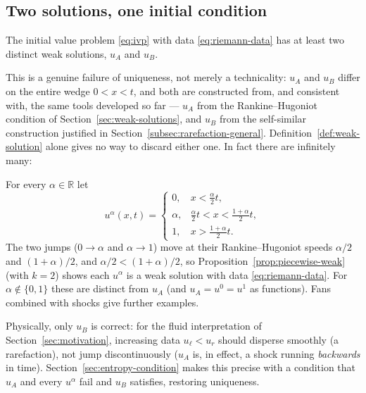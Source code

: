 \subsection{Two solutions, one initial condition}
\label{subsec:nonuniq-conclusion}

\begin{corollary}
\label{cor:nonuniqueness}
The initial value problem \eqref{eq:ivp} with data \eqref{eq:riemann-data}
has at least two distinct weak solutions, $u_A$ and $u_B$.
\end{corollary}

This is a genuine failure of uniqueness, not merely a technicality: $u_A$
and $u_B$ differ on the entire wedge $0<x<t$, and both are constructed
from, and consistent with, the same tools developed so far ---
$u_A$ from the Rankine--Hugoniot condition of
Section~\ref{sec:weak-solutions}, and $u_B$ from the self-similar
construction justified in Section~\ref{subsec:rarefaction-general}.
Definition~\ref{def:weak-solution} alone gives no way to discard either
one. In fact there are infinitely many:

\begin{remark}
\label{rem:infinite-family}
For every $\alpha\in\mathbb{R}$ let
\begin{equation*}
  u^\alpha(x,t)=\begin{cases}
    0, & x<\tfrac{\alpha}{2}t,\\
    \alpha, & \tfrac{\alpha}{2}t<x<\tfrac{1+\alpha}{2}t,\\
    1, & x>\tfrac{1+\alpha}{2}t .
  \end{cases}
\end{equation*}
The two jumps ($0\to\alpha$ and $\alpha\to1$) move at their
Rankine--Hugoniot speeds $\alpha/2$ and $(1+\alpha)/2$, and
$\alpha/2<(1+\alpha)/2$, so Proposition~\ref{prop:piecewise-weak}
(with $k=2$) shows each $u^\alpha$ is a weak solution with data
\eqref{eq:riemann-data}. For $\alpha\notin\{0,1\}$ these are distinct
from $u_A$ (and $u_A=u^0=u^1$ as functions). Fans combined with shocks
give further examples.
\end{remark}

\begin{remark}
Physically, only $u_B$ is correct: for the fluid interpretation of
Section~\ref{sec:motivation}, increasing data $u_\ell<u_r$ should
disperse smoothly (a rarefaction), not jump discontinuously ($u_A$ is,
in effect, a shock running \emph{backwards} in time).
Section~\ref{sec:entropy-condition} makes this precise with a condition
that $u_A$ and every $u^\alpha$ fail and $u_B$ satisfies, restoring
uniqueness.
\end{remark}

